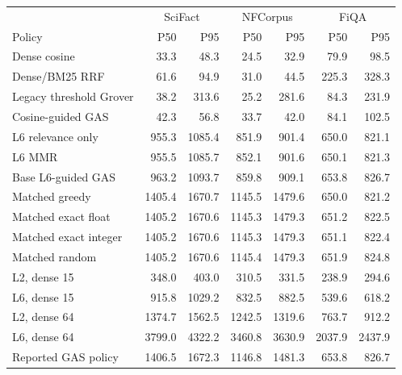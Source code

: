 \begin{tabular}{lrrrrrr}
\toprule
& \multicolumn{2}{c}{SciFact} & \multicolumn{2}{c}{NFCorpus} & \multicolumn{2}{c}{FiQA}\\
Policy & P50 & P95 & P50 & P95 & P50 & P95\\
\midrule
Dense cosine & 33.3 & 48.3 & 24.5 & 32.9 & 79.9 & 98.5\\
Dense/BM25 RRF & 61.6 & 94.9 & 31.0 & 44.5 & 225.3 & 328.3\\
Legacy threshold Grover & 38.2 & 313.6 & 25.2 & 281.6 & 84.3 & 231.9\\
Cosine-guided GAS & 42.3 & 56.8 & 33.7 & 42.0 & 84.1 & 102.5\\
L6 relevance only & 955.3 & 1085.4 & 851.9 & 901.4 & 650.0 & 821.1\\
L6 MMR & 955.5 & 1085.7 & 852.1 & 901.6 & 650.1 & 821.3\\
Base L6-guided GAS & 963.2 & 1093.7 & 859.8 & 909.1 & 653.8 & 826.7\\
Matched greedy & 1405.4 & 1670.7 & 1145.5 & 1479.6 & 650.0 & 821.2\\
Matched exact float & 1405.2 & 1670.6 & 1145.3 & 1479.3 & 651.2 & 822.5\\
Matched exact integer & 1405.2 & 1670.6 & 1145.3 & 1479.3 & 651.1 & 822.4\\
Matched random & 1405.2 & 1670.6 & 1145.4 & 1479.3 & 651.9 & 824.8\\
L2, dense 15 & 348.0 & 403.0 & 310.5 & 331.5 & 238.9 & 294.6\\
L6, dense 15 & 915.8 & 1029.2 & 832.5 & 882.5 & 539.6 & 618.2\\
L2, dense 64 & 1374.7 & 1562.5 & 1242.5 & 1319.6 & 763.7 & 912.2\\
L6, dense 64 & 3799.0 & 4322.2 & 3460.8 & 3630.9 & 2037.9 & 2437.9\\
Reported GAS policy & 1406.5 & 1672.3 & 1146.8 & 1481.3 & 653.8 & 826.7\\
\bottomrule
\end{tabular}
